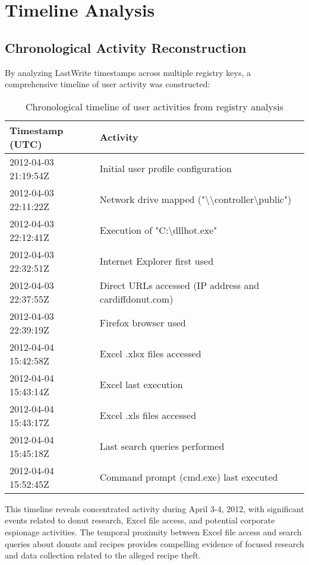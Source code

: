 \section{Timeline Analysis}
\subsection{Chronological Activity Reconstruction}
By analyzing LastWrite timestamps across multiple registry keys, a comprehensive timeline of user activity was constructed:

\begin{table}[h]
    \centering
    \begin{tabular}{|p{4cm}|p{9cm}|}
        \hline
        \textbf{Timestamp (UTC)} & \textbf{Activity} \\
        \hline
        2012-04-03 21:19:54Z & Initial user profile configuration \\
        \hline
        2012-04-03 22:11:22Z & Network drive mapped ("\textbackslash\textbackslash controller\textbackslash public") \\
        \hline
        2012-04-03 22:12:41Z & Execution of "C:\textbackslash dllhot.exe" \\
        \hline
        2012-04-03 22:32:51Z & Internet Explorer first used \\
        \hline
        2012-04-03 22:37:55Z & Direct URLs accessed (IP address and cardiffdonut.com) \\
        \hline
        2012-04-03 22:39:19Z & Firefox browser used \\
        \hline
        2012-04-04 15:42:58Z & Excel .xlsx files accessed \\
        \hline
        2012-04-04 15:43:14Z & Excel last execution \\
        \hline
        2012-04-04 15:43:17Z & Excel .xls files accessed \\
        \hline
        2012-04-04 15:45:18Z & Last search queries performed \\
        \hline
        2012-04-04 15:52:45Z & Command prompt (cmd.exe) last executed \\
        \hline
    \end{tabular}
    \caption{Chronological timeline of user activities from registry analysis}
    \label{tab:activity_timeline}
\end{table}

This timeline reveals concentrated activity during April 3-4, 2012, with significant events related to donut research, Excel file access, and potential corporate espionage activities. The temporal proximity between Excel file access and search queries about donuts and recipes provides compelling evidence of focused research and data collection related to the alleged recipe theft.

